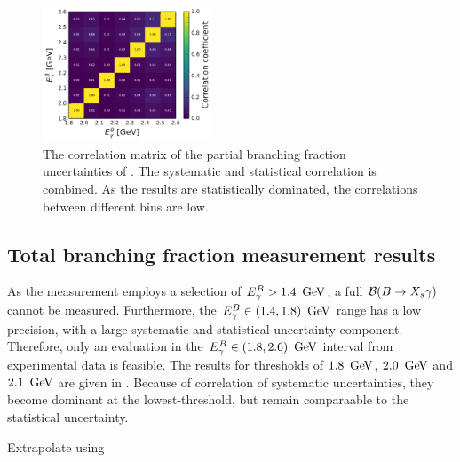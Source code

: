 \begin{figure}[htbp!]
    \centering
    \includegraphics[width=0.45\textwidth]{figures/final_results/correlation_matrix_uncertainties.pdf}
    \caption{\label{fig:correlation_uncertainty_matrix} 
    The correlation matrix of the partial branching fraction uncertainties of .
    The systematic and statistical correlation is combined.
    As the results are statistically dominated, the correlations between different \EB bins are low.
    }
\end{figure}

\subsection{Total branching fraction measurement results}\label{sec:total_branching_fraction_results}

As the measurement employs a selection of ${E^B_{\gamma}}>1.4~\mathrm{\,Ge\kern -0.1em V}$, a full $\mathcal{B}(\BtoXsgamma)$ cannot be measured.
Furthermore, the ${E^B_{\gamma}}\in(1.4,1.8)~\mathrm{\,Ge\kern -0.1em V}$ range has a low precision, with a large systematic and statistical uncertainty component.
Therefore, only an evaluation in the ${E^B_{\gamma}}\in(1.8,2.6)~\mathrm{\,Ge\kern -0.1em V}$ interval from experimental data is feasible.
The results for thresholds of $1.8~\mathrm{\,Ge\kern -0.1em V}$, $2.0~\mathrm{\,Ge\kern -0.1em V}$ and $2.1~\mathrm{\,Ge\kern -0.1em V}$ are given in .
Because of correlation of systematic uncertainties, they become dominant at the lowest-\EB threshold, but remain comparaable to the statistical uncertainty.

Extrapolate using \cite{Buchmuller:2005zv}

